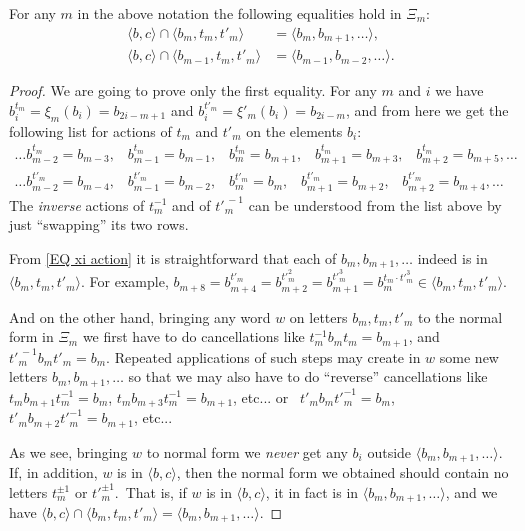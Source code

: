 \documentclass[10pt,a4paper]{amsart}
\begin{document}
\begin{Lemma}
\label{LE Ksi}
For any $m$ in the above notation the following equalities hold in $\Xi_m$:
\begin{equation}
\label{EQ Ksi two equality}
\begin{split}
\langle b,c \rangle \cap \langle b_m, t_m, t'_m\rangle &= \langle b_m, b_{m+1},\ldots\rangle,
\\
\langle b,c \rangle \cap \langle b_{m-1}, t_m, t'_m\rangle &= \langle b_{m-1}, b_{m-2},\ldots\rangle.
\end{split}
\end{equation}
\end{Lemma}

\begin{proof}
We are going to prove only the first equality. 
For any $m$ and $i$ we have 
$b_{i}^{t_m} = \xi_m(b_i)=b_{2i-m+1}$ and 
$b_{i}^{t'_m} = \xi'_m(b_i)=b_{2i-m}$, and from here we get the following list for actions of $t_m$ and $t'_{m}$ on the elements $b_i$:
\begin{equation}
\label{EQ xi action}
\begin{split}
\ldots
b_{m-2}^{t_m} \!=\! b_{m-3},\;\;\;
b_{m-1}^{t_m} \!=\! b_{m-1},\;\;\;
b_{m}^{t_m}   \!=\! b_{m+1},\;\;\;
b_{m+1}^{t_m} \!=\! b_{m+3},\;\;\;
b_{m+2}^{t_m} \!=\! b_{m+5},
\ldots\\
\ldots
b_{m-2}^{t'_m} \!=\! b_{m-4},\;\;\;
b_{m-1}^{t'_m} \!=\! b_{m-2},\;\;\;
b_{m}^{t'_m}   \!=\! b_{m},\;\;\;
b_{m+1}^{t'_m} \!=\! b_{m+2},\;\;\;
b_{m+2}^{t'_m} \!=\! b_{m+4},\ldots
\;\;
\end{split}
\end{equation}
The \textit{inverse} actions of $t_m^{-1}$ and of ${t'}_{\!\!\!m}^{\,-1}$ can be understood from the list above by just ``swapping'' its two rows.

From \eqref{EQ xi action} it is straightforward that each of $b_m, b_{m+1},\ldots$ indeed is in $\langle b_m, t_m, t'_m\rangle$. 
%
For example, 
$b_{m+8}
=b_{m+4}^{t'_m}
=b_{m+2}^{{t'}_{\!\!\!m}^2}
=b_{m+1}^{{t'}_{\!\!\!m}^3}
=b_{m}^{t_m \cdot {t'}_{\!\!\!m}^3}\in \langle b_m, t_m, t'_m\rangle$. 

And on the other hand, bringing any word $w$ on letters $b_m, t_m, t'_m$ to the normal form in 
$\Xi_m$
we first have to  do cancellations like $t_m^{-1} b_m t_m=b_{m+1}$, and   ${t'}_{\!\!\!m}^{\,-1} b_{m} {t'}_{\!\!\!m}=b_{m}$. Repeated applications of such steps may create in $w$ some new letters 
$b_m, b_{m+1},\ldots$ so that we may also have to do ``reverse'' cancellations like 
$t_m b_{m+1} t_m^{-1}=b_{m}$, 
\; 
$t_m b_{m+3} t_m^{-1}=b_{m+1}$, etc...
or \,
$t'_m b_m {t'}_m^{-1}=b_{m}$,
\;
$t'_m b_{m+2} {t'}_m^{-1}=b_{m+1}$, etc...

As we see, bringing $w$ to normal form we \textit{never} get any $b_i$ outside $\langle b_m, b_{m+1},\ldots\rangle$. If, in addition, $w$ is in $\langle b,c \rangle$, then the normal form we obtained should contain no letters 
$t_m^{\pm 1}$ or ${t'}_{\!\!\!m}^{\pm 1}$\!.\,
That is, if $w$ is in $\langle b,c \rangle$, it in fact is in $\langle b_m, b_{m+1},\ldots\rangle$, and we have $\langle b,c \rangle \cap \langle b_m, t_m, t'_m\rangle = \langle b_m, b_{m+1},\ldots\rangle$.
\end{proof}
\end{document}
